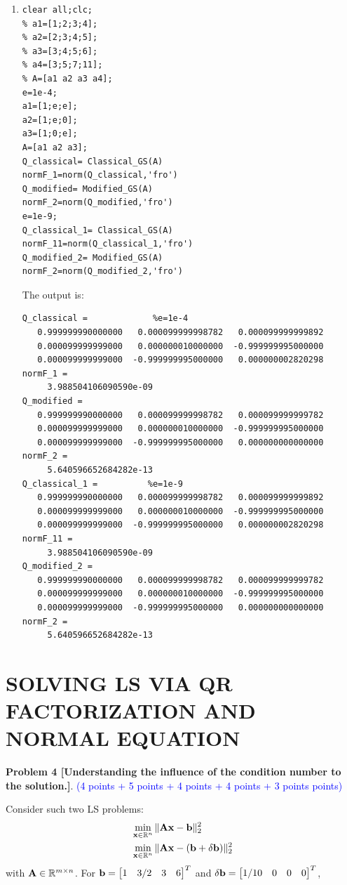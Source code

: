 \documentclass[english,onecolumn]{IEEEtran}
\begin{document}
\begin{enumerate}
\item
\begin{lstlisting}
clear all;clc;
% a1=[1;2;3;4];
% a2=[2;3;4;5];
% a3=[3;4;5;6];
% a4=[3;5;7;11];
% A=[a1 a2 a3 a4];
e=1e-4;
a1=[1;e;e];
a2=[1;e;0];
a3=[1;0;e];
A=[a1 a2 a3];
Q_classical= Classical_GS(A)
normF_1=norm(Q_classical,'fro')
Q_modified= Modified_GS(A)
normF_2=norm(Q_modified,'fro')
e=1e-9;
Q_classical_1= Classical_GS(A)
normF_11=norm(Q_classical_1,'fro')
Q_modified_2= Modified_GS(A)
normF_2=norm(Q_modified_2,'fro')
\end{lstlisting}
The output is:
\begin{lstlisting}
Q_classical =             %e=1e-4
   0.999999990000000   0.000099999998782   0.000099999999892
   0.000099999999000   0.000000010000000  -0.999999995000000
   0.000099999999000  -0.999999995000000   0.000000002820298
normF_1 =
     3.988504106090590e-09
Q_modified =
   0.999999990000000   0.000099999998782   0.000099999999782
   0.000099999999000   0.000000010000000  -0.999999995000000
   0.000099999999000  -0.999999995000000   0.000000000000000
normF_2 =
     5.640596652684282e-13
Q_classical_1 =          %e=1e-9
   0.999999990000000   0.000099999998782   0.000099999999892
   0.000099999999000   0.000000010000000  -0.999999995000000
   0.000099999999000  -0.999999995000000   0.000000002820298
normF_11 =
     3.988504106090590e-09
Q_modified_2 =
   0.999999990000000   0.000099999998782   0.000099999999782
   0.000099999999000   0.000000010000000  -0.999999995000000
   0.000099999999000  -0.999999995000000   0.000000000000000
normF_2 =
     5.640596652684282e-13
\end{lstlisting}
\end{enumerate}



\newpage
\section{SOLVING LS VIA QR FACTORIZATION AND NORMAL EQUATION}
\noindent\textbf{Problem 4 [Understanding the influence of the condition number to the solution.]}. \textcolor{blue}{(4 points + 5 points + 4 points + 4 points + 3 points points) }

Consider such two LS problems:
\begin{align}
    &\min_{{\bf x}\in\mathbb{R}^n} \|{\bf Ax - b}\|_2^2 \label{axb}\\
    &\min_{{\bf x}\in\mathbb{R}^n} \|{\bf A}{\bf x} - ({\bf b}+\delta{\bf b })\|_2^2 \nonumber%
\end{align}
with ${\bf A}\in \mathbb{R}^{m\times n}$. For ${\bf b} = \begin{bmatrix}
    1 & 3/2 & 3 & 6
    \end{bmatrix}^T$
    and 
    $\delta{\bf b} = \begin{bmatrix}
    1/10 & 0 & 0 & 0
    \end{bmatrix}^T$,
\end{document}
